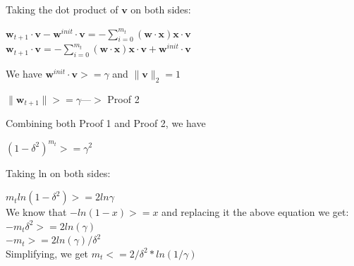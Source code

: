 \documentclass[a4paper]{article}
\theoremstyle{definition}
\renewcommand\vec[1]{\boldsymbol{#1}}
\newenvironment{soln}{
    \leavevmode\color{blue}\ignorespaces
}{}
\begin{document}
\begin{soln}
\begin{center}
	  \end{center}
	  Taking the dot product of $\vec v$ on both sides: \\
	  \begin{center}
	  $\vec w_{t+1} \cdot \vec v - \vec w^{init} \cdot \vec v = - \sum_{i = 0}^{m_t} (\vec w \cdot \vec x)\vec x \cdot \vec v$ \\
	  $\vec w_{t+1} \cdot \vec v =  - \sum_{i = 0}^{m_t} (\vec w \cdot \vec x)\vec x \cdot \vec v + \vec w^{init} \cdot \vec v$ \\
	   \end{center}
	 We have $\vec w^{init} \cdot \vec v >= \gamma$ and $\|\vec v\|_2 = 1$ \\
	  \begin{center}
	  $\|\vec w_{t+1}\| >= \gamma $---$>$ Proof 2
	  \end{center}
	  Combining both Proof 1 and Proof 2, we have 
	  \begin{center}
	  ${(1 - \delta^2)}^{m_t} >= \gamma^2$
	 \end{center}
	 Taking ln on both sides: \\
	  \begin{center}
	  $m_t ln(1 - \delta^2) >= 2 ln \gamma$ \\
	  We know that $- ln(1 - x) >= x$ and replacing it the above equation we get: \\
	  $-m_t {\delta}^2 >= 2 ln(\gamma)$ \\
	  $-m_t >= 2 ln(\gamma) / {\delta}^2 $ \\
	  Simplifying, we get $m_t <= 2 / {\delta}^2 *ln(1/\gamma) $ \\
	  
	  \end{center}
	\end{soln}
\end{document}

